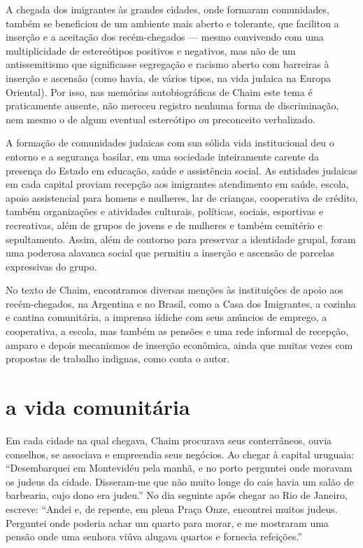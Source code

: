 A chegada dos imigrantes às grandes cidades, onde formaram comunidades,
também se beneficiou de um ambiente mais aberto e tolerante, que
facilitou a inserção e a aceitação dos recém-chegados --- mesmo
convivendo com uma multiplicidade de estereótipos positivos e negativos,
mas não de um antissemitismo que significasse segregação e racismo
aberto com barreiras à inserção e ascensão (como havia, de vários tipos,
na vida judaica na Europa Oriental). Por isso, nas memórias
autobiográficas de Chaim este tema é praticamente ausente, não mereceu
registro nenhuma forma de discriminação, nem mesmo o de algum eventual
estereótipo ou preconceito verbalizado.%

A formação de comunidades judaicas com sua sólida vida institucional deu
o entorno e a segurança basilar, em uma sociedade inteiramente carente
da presença do Estado em educação, saúde e assistência social. As
entidades judaicas em cada capital proviam recepção aos
imigrantes atendimento em saúde, escola, apoio assistencial para homens
e mulheres, lar de crianças, cooperativa de crédito, também organizações
e atividades culturais, políticas, sociais, esportivas e recreativas,
além de grupos de jovens e de mulheres e também cemitério e
sepultamento. Assim, além de contorno para preservar a identidade
grupal, foram uma poderosa alavanca social que permitiu
a inserção e ascensão de parcelas expressivas do grupo.

No texto de Chaim, encontramos diversas menções às instituições de apoio
aos recém-chegados, na Argentina e no Brasil, como a Casa dos
Imigrantes, a cozinha e cantina comunitária, a imprensa iídiche com seus
anúncios de emprego, a cooperativa, a escola, mas também as pensões e
uma rede informal de recepção, amparo e depois mecanismos de inserção
econômica, ainda que muitas vezes com propostas de trabalho indignas,
como conta o autor.

\section{a vida comunitária}

Em cada cidade na qual chegava, Chaim procurava seus conterrâneos, ouvia
conselhos, se associava e empreendia seus negócios. Ao chegar à capital
uruguaia: ``Desembarquei em Montevidéu pela manhã, e no porto perguntei 
onde moravam os judeus da cidade. Disseram-me que não muito
longe do cais havia um salão de barbearia, cujo dono era judeu.'' No dia
seguinte após chegar ao Rio de Janeiro, escreve: ``Andei
e, de repente, em plena Praça Onze, encontrei muitos judeus.
Perguntei onde poderia achar um quarto para morar, e me
mostraram uma pensão onde uma senhora viúva alugava quartos e fornecia
refeições.'' 

